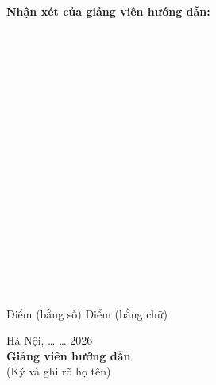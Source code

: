 \documentclass[12pt,a4paper]{article}
\begin{document}
\newpage
\begin{center}
    \textbf{Nhận xét của giảng viên hướng dẫn:}
\end{center}

\vspace{0.2cm}

\noindent\makebox[\linewidth]{\dotfill}\\[0.2cm]
\noindent\makebox[\linewidth]{\dotfill}\\[0.2cm]
\noindent\makebox[\linewidth]{\dotfill}\\[0.2cm]
\noindent\makebox[\linewidth]{\dotfill}\\[0.2cm]
\noindent\makebox[\linewidth]{\dotfill}\\[0.2cm]
\noindent\makebox[\linewidth]{\dotfill}\\[0.2cm]
\noindent\makebox[\linewidth]{\dotfill}\\[0.2cm]
\noindent\makebox[\linewidth]{\dotfill}\\[0.2cm]
\noindent\makebox[\linewidth]{\dotfill}\\[0.2cm]
\noindent\makebox[\linewidth]{\dotfill}\\[0.2cm]
\noindent\makebox[\linewidth]{\dotfill}\\[0.2cm]
\noindent\makebox[\linewidth]{\dotfill}\\[0.2cm]
\noindent\makebox[\linewidth]{\dotfill}\\[0.2cm]
\noindent\makebox[\linewidth]{\dotfill}\\[0.2cm]
\noindent\makebox[\linewidth]{\dotfill}\\[0.2cm]
\noindent\makebox[\linewidth]{\dotfill}\\[0.2cm]
\noindent\makebox[\linewidth]{\dotfill}\\[0.2cm]
\noindent\makebox[\linewidth]{\dotfill}

\noindent\hspace{3cm} Điểm (bằng số) \dotfill{} Điểm (bằng chữ) \dotfill

\vspace{1.5cm}

\begin{center}
    Hà Nội, \ldots{} \ldots{} 2026\\[0.2cm]
    \textbf{Giảng viên hướng dẫn}\\[0.1cm]
    (Ký và ghi rõ họ tên)
\end{center}
\end{document}
